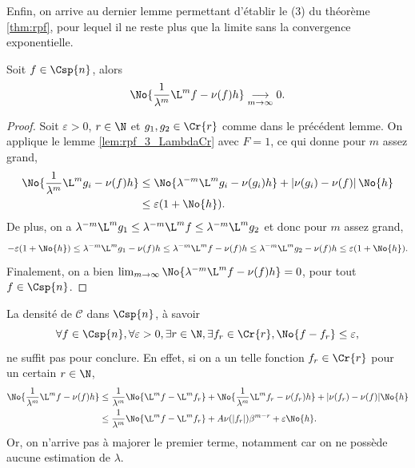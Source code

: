   Enfin, on arrive au dernier lemme permettant d'établir le (3) du théorème \ref{thm:rpf}, pour lequel il ne reste plus que la limite
  sans la convergence exponentielle.

  \begin{proposition}
    \label{prop:rpf_3}
    \leanok
    Soit $f \in \Csp{n}$, alors
    $$\No{\frac 1 {\lambda^m} \L^mf - \nu(f)h} \underset{m \to \infty}{\longrightarrow} 0.$$
  \end{proposition}

  \begin{proof}
    Soit $\varepsilon > 0$, $r \in \N$ et $g_1, g_2 \in \Cr{r}$ comme dans le précédent lemme.
    On applique le lemme \ref{lem:rpf_3_LambdaCr} avec $F = 1$, ce qui donne pour $m$ assez grand,
    \begin{align*}
      \No{\frac 1 {\lambda^m}\L^m g_i - \nu(f)h} &\leq \No{\lambda^{-m}\L^mg_i - \nu(g_i)h} + \left|\nu(g_i) - \nu(f)\right|\No{h} \\
						 &\leq \varepsilon(1 + \No{h}).
    \end{align*}
    De plus, on a $\lambda^{-m}\L^mg_1 \leq \lambda^{-m}\L^mf \leq \lambda^{-m}\L^mg_2$ et donc pour $m$ assez grand,
    $$-\varepsilon(1 + \No{h}) \leq \lambda^{-m}\L^mg_1 - \nu(f)h
			       \leq \lambda^{-m}\L^mf - \nu(f)h \leq \lambda^{-m}\L^mg_2 - \nu(f)h
								\leq \varepsilon(1+\No{h}).
    $$
    Finalement, on a bien $\lim_{m\to\infty}{\No{\lambda^{-m}\L^mf - \nu(f)h}} = 0$, pour tout $f \in \Csp{n}$.
  \end{proof}

  \begin{remark}
    La densité de $\mathcal C$ dans $\Csp{n}$, à savoir
    $$\forall f \in\Csp{n}, \forall \varepsilon > 0, \exists r \in \N, \exists f_r\in \Cr{r}, \No{f - f_r} \leq \varepsilon,$$
    ne suffit pas pour conclure. En effet, si on a un telle fonction $f_r \in \Cr{r}$ pour un certain $r \in \N$,
    \begin{align*}
      \No{\frac 1 {\lambda^m}\L^mf  - \nu(f)h} &\leq \frac{1}{\lambda^m}\No{\L^mf - \L^mf_r}
						      + \No{\frac 1 {\lambda^m}\L^mf_r - \nu(f_r)h}
						      + |\nu(f_r) - \nu(f)|\No{h} \\
					    &\leq \frac{1}{\lambda^m}\No{\L^mf - \L^mf_r} + A\nu(|f_r|)\beta^{m - r} + \varepsilon\No{h}.
    \end{align*}
    Or, on n'arrive pas à majorer le premier terme, notamment car on ne possède aucune estimation de $\lambda$.
  \end{remark}


